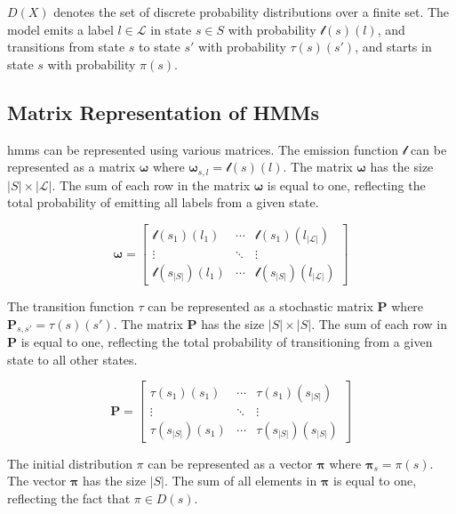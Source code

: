 $D(X)$ denotes the set of discrete probability distributions over a finite set.
The model emits a label $l \in \mathcal{L}$ in state $s \in S$ with probability $\mathscr{l}(s)(l)$, and transitions from state $s$ to state $s'$ with probability $\tau(s)(s')$, and starts in state $s$ with probability $\pi(s)$.

\subsection{Matrix Representation of HMMs}\label{subsec:matrix-representation}
\glspl{hmm} can be represented using various matrices.
The emission function $\mathscr{l}$ can be represented as a matrix $\pmb{\omega}$ where $\pmb{\omega}_{s, l} = \mathscr{l}(s)(l)$.
The matrix $\pmb{\omega}$ has the size $|S| \times |\mathcal{L}|$.
The sum of each row in the matrix $\pmb{\omega}$ is equal to one, reflecting the total probability of emitting all labels from a given state.


\[
    \pmb{\omega} = \begin{bmatrix}
                 \mathscr{l}(s_1)(l_1)     & \cdots & \mathscr{l}(s_1)(l_{|\mathcal{L}|})     \\
                 \vdots                    & \ddots & \vdots                                  \\
                 \mathscr{l}(s_{|S|})(l_1) & \cdots & \mathscr{l}(s_{|S|})(l_{|\mathcal{L}|})
    \end{bmatrix}
\]


The transition function $\tau$ can be represented as a stochastic matrix $\pmb{P}$ where $\pmb{P}_{s, s'} = \tau(s)(s')$.
The matrix $\pmb{P}$ has the size $|S| \times |S|$.
The sum of each row in $\pmb{P}$ is equal to one, reflecting the total probability of transitioning from a given state to all other states.

\[
    \pmb{P} = \begin{bmatrix}
            \tau(s_1)(s_1)     & \cdots & \tau(s_1)(s_{|S|})     \\
            \vdots             & \ddots & \vdots                 \\
            \tau(s_{|S|})(s_1) & \cdots & \tau(s_{|S|})(s_{|S|})
    \end{bmatrix}
\]

The initial distribution $\pi$ can be represented as a vector $\pmb{\pi}$ where $\pmb{\pi}_s = \pi(s)$.
The vector $\pmb{\pi}$ has the size $|S|$.
The sum of all elements in $\pmb{\pi}$ is equal to one, reflecting the fact that $\pi \in D(s)$.


